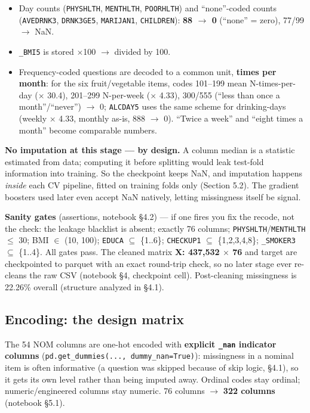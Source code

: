 \documentclass[11pt,a4paper]{article}
\providecommand{\tightlist}{\setlength{\itemsep}{2pt}\setlength{\parskip}{0pt}}
\begin{document}
{\begin{itemize}
\tightlist
\item
  Day counts (\texttt{PHYSHLTH}, \texttt{MENTHLTH}, \texttt{POORHLTH}) and ``none''-coded counts (\texttt{AVEDRNK3}, \texttt{DRNK3GE5}, \texttt{MARIJAN1}, \texttt{CHILDREN}): \textbf{88 $\rightarrow$ 0} (``none'' = zero), 77/99 $\rightarrow$ NaN.
\item
  \texttt{\_BMI5} is stored $\times$100 $\rightarrow$ divided by 100.
\item
  Frequency-coded questions are decoded to a common unit, \textbf{times per month}: for the six fruit/vegetable items, codes 101--199 mean N-times-per-day ($\times$ 30.4), 201--299 N-per-week ($\times$ 4.33), 300/555 (``less than once a month''/``never'') $\rightarrow$ 0; \texttt{ALCDAY5} uses the same scheme for drinking-days (weekly $\times$ 4.33, monthly as-is, 888 $\rightarrow$ 0). ``Twice a week'' and ``eight times a month'' become comparable numbers.
\end{itemize}

\textbf{No imputation at this stage --- by design.} A column median is a statistic estimated from data; computing it before splitting would leak test-fold information into training. So the checkpoint keeps NaN, and imputation happens \emph{inside} each CV pipeline, fitted on training folds only (Section 5.2). The gradient boosters used later even accept NaN natively, letting missingness itself be signal.

\textbf{Sanity gates} (assertions, notebook \S{}4.2) --- if one fires you fix the recode, not the check: the leakage blacklist is absent; exactly 76 columns; \texttt{PHYSHLTH}/\texttt{MENTHLTH} $\le$ 30; BMI $\in$ (10, 100); \texttt{EDUCA} $\subseteq$ \{1..6\}; \texttt{CHECKUP1} $\subseteq$ \{1,2,3,4,8\}; \texttt{\_SMOKER3} $\subseteq$ \{1..4\}. All gates pass. The cleaned matrix \textbf{X: 437,532 $\times$ 76} and target are checkpointed to parquet with an exact round-trip check, so no later stage ever re-cleans the raw CSV (notebook \S{}4, checkpoint cell). Post-cleaning missingness is 22.26\% overall (structure analyzed in \S{}4.1).

\subsection{Encoding: the design matrix}\label{encoding-the-design-matrix}

The 54 NOM columns are one-hot encoded with \textbf{explicit \texttt{\_nan} indicator columns} (\texttt{pd.get\_dummies(...,\ dummy\_nan=True)}): missingness in a nominal item is often informative (a question was skipped because of skip logic, \S{}4.1), so it gets its own level rather than being imputed away. Ordinal codes stay ordinal; numeric/engineered columns stay numeric. 76 columns $\rightarrow$ \textbf{322 columns} (notebook \S{}5.1).

}
\end{document}
